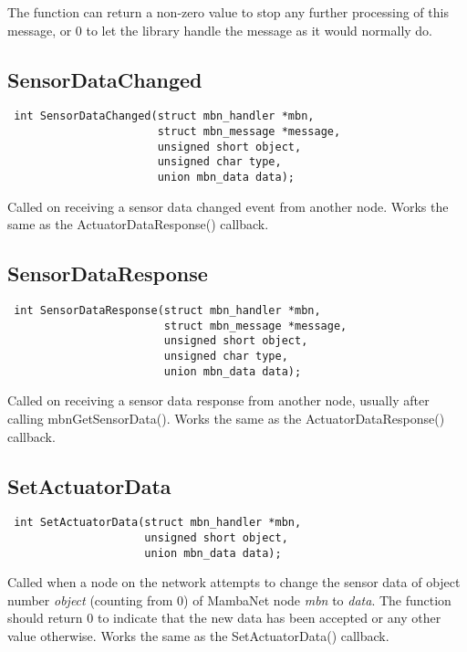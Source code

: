 \documentclass[a4paper]{report}
\begin{document}
The function can return a non-zero value to stop any further processing of this message, or 0 to let the library handle the message as it would normally do.


\subsection{SensorDataChanged}
\begin{verbatim}
 int SensorDataChanged(struct mbn_handler *mbn,
                       struct mbn_message *message,
                       unsigned short object,
                       unsigned char type,
                       union mbn_data data);
\end{verbatim}
Called on receiving a sensor data changed event from another node. Works the same as the ActuatorDataResponse() callback.


\subsection{SensorDataResponse}
\begin{verbatim}
 int SensorDataResponse(struct mbn_handler *mbn,
                        struct mbn_message *message,
                        unsigned short object,
                        unsigned char type,
                        union mbn_data data);
\end{verbatim}
Called on receiving a sensor data response from another node, usually after calling mbnGetSensorData(). Works the same as the ActuatorDataResponse() callback.


\subsection{SetActuatorData}
\begin{verbatim}
 int SetActuatorData(struct mbn_handler *mbn,
                     unsigned short object,
                     union mbn_data data);
\end{verbatim}
Called when a node on the network attempts to change the sensor data of object number \textit{object} (counting from 0) of MambaNet node \textit{mbn} to \textit{data}. The function should return 0 to indicate that the new data has been accepted or any other value otherwise. Works the same as the SetActuatorData() callback.
\end{document}

